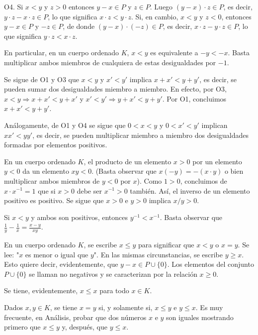 \documentclass[12pt,oneside]{book}
\begin{document}
O4. Si \(x < y\) y \(z > 0\) entonces \(y - x \in P\) y \(z \in P\). Luego \((y - x) \cdot z \in P\), es decir, \(y \cdot z - x \cdot z \in P\), lo que significa \(x \cdot z < y \cdot z\). Si, en cambio, \(x < y\) y \(z < 0\), entonces \(y - x \in P\) y \(-z \in P\), de donde \((y - x) \cdot (-z) \in P\), es decir, \(x \cdot z - y \cdot z \in P\), lo que significa \(y \cdot z < x \cdot z\).

En particular, en un cuerpo ordenado \(K\), \(x < y\) es equivalente a \(-y < -x\). Basta multiplicar ambos miembros de cualquiera de estas desigualdades por \(-1\).

Se sigue de O1 y O3 que \(x < y\) y \(x' < y'\) implica \(x + x' < y + y'\), es decir, se pueden sumar dos desigualdades miembro a miembro. En efecto, por O3, \(x < y \Rightarrow x + x' < y + x'\) y \(x' < y' \Rightarrow y + x' < y + y'\). Por O1, concluimos \(x + x' < y + y'\).

Análogamente, de O1 y O4 se sigue que \(0 < x < y\) y \(0 < x' < y'\) implican \(xx' < yy'\), es decir, se pueden multiplicar miembro a miembro dos desigualdades formadas por elementos positivos.

En un cuerpo ordenado \(K\), el producto de un elemento \(x > 0\) por un elemento \(y < 0\) da un elemento \(xy < 0\). (Basta observar que \(x(-y) = -(x \cdot y)\) o bien multiplicar ambos miembros de \(y < 0\) por \(x\)). Como \(1 > 0\), concluimos de \(x \cdot x^{-1} = 1\) que si \(x > 0\) debe ser \(x^{-1} > 0\) también. Así, el inverso de un elemento positivo es positivo. Se sigue que \(x > 0\) e \(y > 0\) implica \(x/y > 0\).

Si \(x < y\) y ambos son positivos, entonces \(y^{-1} < x^{-1}\). Basta observar que \(\frac{1}{y} - \frac{1}{x} = \frac{x-y}{xy}\).

En un cuerpo ordenado \(K\), se escribe \(x \leq y\) para significar que \(x < y\) o \(x = y\). Se lee: "\(x\) es menor o igual que \(y\)". En las mismas circunstancias, se escribe \(y \geq x\). Esto quiere decir, evidentemente, que \(y - x \in P \cup \{0\}\). Los elementos del conjunto \(P \cup \{0\}\) se llaman no negativos y se caracterizan por la relación \(x \geq 0\).

Se tiene, evidentemente, \(x \leq x\) para todo \(x \in K\).

Dados \(x, y \in K\), se tiene \(x = y\) si, y solamente si, \(x \leq y\) e \(y \leq x\). Es muy frecuente, en Análisis, probar que dos números \(x\) e \(y\) son iguales mostrando primero que \(x \leq y\) y, después, que \(y \leq x\).
\end{document}

